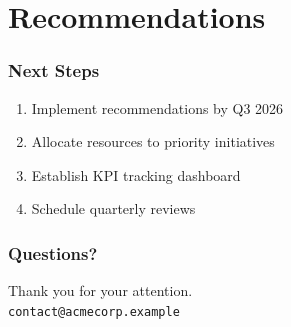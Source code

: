 \documentclass[aspectratio=169]{beamer}
\begin{document}
\section{Recommendations}

\begin{frame}
    \frametitle{Next Steps}
    \begin{enumerate}
        \item Implement recommendations by Q3 2026
        \item Allocate resources to priority initiatives
        \item Establish KPI tracking dashboard
        \item Schedule quarterly reviews
    \end{enumerate}
\end{frame}

\begin{frame}
    \frametitle{Questions?}
    \centering
    \Large
    Thank you for your attention.\\
    \vspace{1cm}
    {\small\texttt{contact@acmecorp.example}}
\end{frame}
\end{document}
